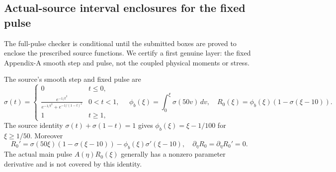 \subsection*{Actual-source interval enclosures for the fixed pulse}
The full-pulse checker is conditional until the submitted boxes are
proved to enclose the prescribed source functions. We certify a first
genuine layer: the fixed Appendix-A smooth step and pulse, not the
coupled physical moments or stress.

The source's smooth step and fixed pulse are
\[
\sigma(t)=\begin{cases}0&t\le0,\\
\displaystyle\frac{e^{-1/t^2}}{e^{-1/t^2}+e^{-1/(1-t)^2}}&0<t<1,\\
1&t\ge1,\end{cases}\quad
\phi_b(\xi)=\int_0^\xi\sigma(50v)\,dv,\quad
R_0(\xi)=\phi_b(\xi)(1-\sigma(\xi-10)).
\]
The source identity $\sigma(t)+\sigma(1-t)=1$ gives
$\phi_b(\xi)=\xi-1/100$ for $\xi\ge1/50$. Moreover
\[
R_0'=\sigma(50\xi)(1-\sigma(\xi-10))
-\phi_b(\xi)\sigma'(\xi-10),\quad
\partial_\eta R_0=\partial_\eta R_0'=0.
\]
The actual main pulse $A(\eta)R_0(\xi)$ generally has a nonzero
parameter derivative and is not covered by this identity.

